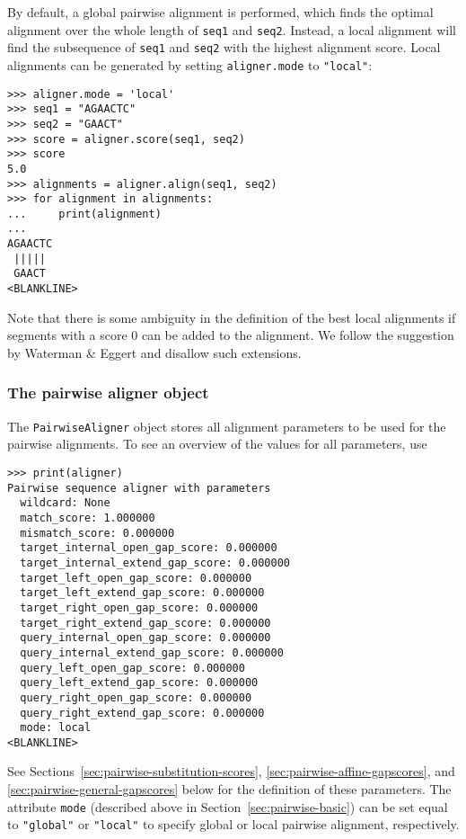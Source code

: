 By default, a global pairwise alignment is performed, which finds the optimal
alignment over the whole length of \verb+seq1+ and \verb+seq2+.
Instead, a local alignment will find the subsequence of
\verb+seq1+ and \verb+seq2+ with the highest alignment score.
Local alignments can be generated by setting \verb+aligner.mode+ to
\verb+"local"+:

\begin{verbatim}
>>> aligner.mode = 'local'
>>> seq1 = "AGAACTC"
>>> seq2 = "GAACT"
>>> score = aligner.score(seq1, seq2)
>>> score
5.0
>>> alignments = aligner.align(seq1, seq2)
>>> for alignment in alignments:
...     print(alignment)
...
AGAACTC
 |||||
 GAACT
<BLANKLINE>
\end{verbatim}

Note that there is some ambiguity in the definition of the best local alignments if segments with a score 0 can be added to the alignment. We follow the suggestion by Waterman \& Eggert \cite{waterman1987} and disallow such extensions.

\subsubsection{The pairwise aligner object}
\label{sec:pairwise-aligner}

The \verb+PairwiseAligner+ object stores all alignment parameters to be used
for the pairwise alignments. To see an overview of the values for all parameters, use

\begin{verbatim}
>>> print(aligner)
Pairwise sequence aligner with parameters
  wildcard: None
  match_score: 1.000000
  mismatch_score: 0.000000
  target_internal_open_gap_score: 0.000000
  target_internal_extend_gap_score: 0.000000
  target_left_open_gap_score: 0.000000
  target_left_extend_gap_score: 0.000000
  target_right_open_gap_score: 0.000000
  target_right_extend_gap_score: 0.000000
  query_internal_open_gap_score: 0.000000
  query_internal_extend_gap_score: 0.000000
  query_left_open_gap_score: 0.000000
  query_left_extend_gap_score: 0.000000
  query_right_open_gap_score: 0.000000
  query_right_extend_gap_score: 0.000000
  mode: local
<BLANKLINE>
\end{verbatim}
See Sections~\ref{sec:pairwise-substitution-scores}, \ref{sec:pairwise-affine-gapscores}, and \ref{sec:pairwise-general-gapscores} below for the definition of these
parameters. The attribute \verb+mode+ (described above in Section~\ref{sec:pairwise-basic}) can be set equal to \verb+"global"+ or \verb+"local"+ to specify global or local pairwise alignment, respectively.

